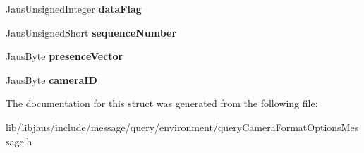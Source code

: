 \begin{DoxyCompactItemize}
\item 
\hypertarget{struct_query_camera_format_options_message_struct_a3d1a47e29084be537adc4dee981c09d5}{\-Jaus\-Unsigned\-Integer {\bfseries data\-Flag}}\label{struct_query_camera_format_options_message_struct_a3d1a47e29084be537adc4dee981c09d5}

\item 
\hypertarget{struct_query_camera_format_options_message_struct_ae542ee4f1f6fc06f5e241034b76916fe}{\-Jaus\-Unsigned\-Short {\bfseries sequence\-Number}}\label{struct_query_camera_format_options_message_struct_ae542ee4f1f6fc06f5e241034b76916fe}

\item 
\hypertarget{struct_query_camera_format_options_message_struct_a773acc199a1ccefb949b113da125b31c}{\-Jaus\-Byte {\bfseries presence\-Vector}}\label{struct_query_camera_format_options_message_struct_a773acc199a1ccefb949b113da125b31c}

\item 
\hypertarget{struct_query_camera_format_options_message_struct_a32f570f54f214b65c71bc59faf8a2de8}{\-Jaus\-Byte {\bfseries camera\-I\-D}}\label{struct_query_camera_format_options_message_struct_a32f570f54f214b65c71bc59faf8a2de8}

\end{DoxyCompactItemize}


\-The documentation for this struct was generated from the following file\-:\begin{DoxyCompactItemize}
\item 
lib/libjaus/include/message/query/environment/query\-Camera\-Format\-Options\-Message.\-h\end{DoxyCompactItemize}
